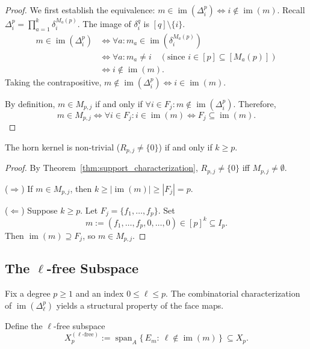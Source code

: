 \begin{proof}
We first establish the equivalence: $m \in \operatorname{im}(\Delta_i^p) \iff i \notin \operatorname{im}(m)$.
Recall $\Delta_i^p = \prod_{a=1}^k \delta_i^{M_a(p)}$. The image of $\delta_i^q$ is $[q] \setminus \{i\}$.
\begin{align*}
m \in \operatorname{im}(\Delta_i^p) &\iff \forall a: m_a \in \operatorname{im}(\delta_i^{M_a(p)}) \\
&\iff \forall a: m_a \ne i \quad (\text{since } i \in [p] \subseteq [M_a(p)])\\
&\iff i \notin \operatorname{im}(m).
\end{align*}
Taking the contrapositive, $m \notin \operatorname{im}(\Delta_i^p) \iff i \in \operatorname{im}(m)$.

By definition, $m \in M_{p,j}$ if and only if $\forall i \in F_j: m \notin \operatorname{im}(\Delta_i^p)$. Therefore,
\[
m \in M_{p,j} \iff \forall i \in F_j: i \in \operatorname{im}(m)
\iff F_j \subseteq \operatorname{im}(m).
\]
\end{proof}

\begin{corollary}\label{cor:missing_indices_existence}
The horn kernel is non-trivial ($R_{p,j} \ne \{0\}$) if and only if $k \ge p$.
\end{corollary}
\begin{proof}
By Theorem~\ref{thm:support_characterization}, $R_{p,j} \ne \{0\}$ iff $M_{p,j} \ne \emptyset$.

($\Rightarrow$) If $m \in M_{p,j}$, then $k \ge |\operatorname{im}(m)| \ge |F_j| = p$.


($\Leftarrow$) Suppose $k \ge p$. Let $F_j = \{f_1, \dots, f_p\}$. Set
\[
m := (f_1, \dots, f_p, 0, \dots, 0)\in [p]^k \subseteq I_p.
\]
Then $\operatorname{im}(m) \supseteq F_j$, so $m \in M_{p,j}$.
\end{proof}


\subsection{\texorpdfstring{The $\ell$-free Subspace}{The l-free Subspace}}

Fix a degree $p\ge 1$ and an index $0\le \ell\le p$.
The combinatorial characterization of $\operatorname{im}(\Delta_\ell^p)$ yields a structural property of the face maps.

\begin{definition}
Define the $\ell$-free subspace
\[
X_p^{(\ell\text{-free})}
:=\operatorname{span}_A\{\,E_{m}:\ \ell \notin \operatorname{im}(m) \,\}\ \subseteq X_p.
\]
\end{definition}

